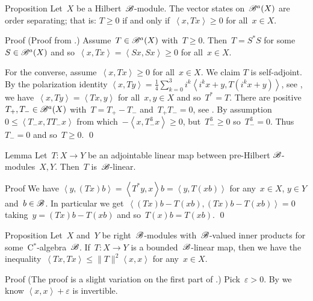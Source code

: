 \begin{parsec}%
\begin{point}{Proposition}%
Let~$X$ be a Hilbert~$\mathscr{B}$-module.
The vector states on~$\mathscr{B}^a(X)$ are order separating;
that is: $T \geq 0$ if and only if~$\left<x,Tx\right> \geq 0$
for all~$x \in X$.
\begin{point}{Proof}%
(Proof from \cite[Lemma 4.1]{lance}.)
Assume~$T \in \mathscr{B}^a(X)$ with~$T \geq 0$.
Then~$T = S^*S$ for some~$S \in \mathscr{B}^a(X)$
    and so~$\left<x, Tx\right> = \left<Sx,Sx\right> \geq 0$
    for all~$x \in X$.

For the converse, assume~$\left<x, Tx\right> \geq 0$
    for all~$x \in X$.
We claim $T$ is self-adjoint.
By the polarization identity
$\left<x, Ty\right>
    = \frac{1}{4} \sum^3_{k=0} i^k \left< i^k x+y, T(i^k x+y)\right>$,
    see ,
    we have~$\left<x,Ty \right> = \left<Tx, y\right>$ for all~$x,y \in X$
    and so~$T^*=T$.
There are positive~$T_+,T_- \in \mathscr{B}^a(X)$
with~$T = T_+ - T_-$ and~$T_+T_- = 0$, see .
By assumption~$0 \leq \left<T_-x,TT_-x\right>$
    from which~$-\left<x,T_-^3x\right> \geq 0$,
    but~$T_-^3 \geq 0$ so~$T_-^3 = 0$.
    Thus~$T_- = 0$ and so~$T \geq 0$. \qed
\end{point}
\end{point}
\begin{point}{Lemma}%
Let~$T\colon X \to Y$
    be an adjointable linear map between pre-Hilbert $\mathscr{B}$-modules~$X,Y$.
Then~$T$ is~$\mathscr{B}$-linear.
\begin{point}{Proof}%
We have
    $\left<y, (Tx)b\right>
    =\left<T^*y, x\right>b
    =\left<y, T(xb)\right>$
for any~$x \in X$, $y \in Y$ and~$b \in \mathscr{B}$.
In particular we
get~$\left<(Tx)b-T(xb), (Tx)b-T(xb)\right>=0$
taking~$y = (Tx)b-T(xb)$
    and so~$T(x)b=T(xb)$. \qed
\end{point}
\end{point}
\begin{point}{Proposition}%
Let~$X$ and~$Y$ be right~$\mathscr{B}$-modules with~$\mathscr{B}$-valued
    inner products for some~C$^*$-algebra~$\mathscr{B}$.
If~$T \colon X \to Y$ is a bounded~$\mathscr{B}$-linear map,
    then we have the
        inequality~$\left<Tx,Tx\right>\leq \|T\|^2 \left<x,x\right>$
    for any~$x \in X$.
\begin{point}{Proof}
(The proof is a slight variation on the first part
of \cite[Thm.~2.8]{paschke}.)
Pick~$\varepsilon > 0$.
By 
    we know $\left<x,x\right> + \varepsilon$ is invertible.

\end{point}
\end{point}
\end{parsec}
